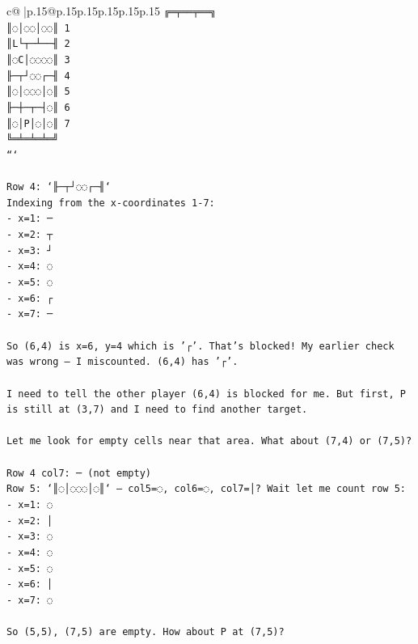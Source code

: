 \documentclass{article}
\begin{document}
{\begin{supertabular}{c@{$\;$}|p{.15\linewidth}@{}p{.15\linewidth}p{.15\linewidth}p{.15\linewidth}p{.15\linewidth}p{.15\linewidth}}
{{{\texttt{╔═╤══╤══╗} \\
\texttt{║◌│◌◌│◌◌║ 1} \\
\texttt{║L└┬─┴──╢ 2} \\
\texttt{║◌C│◌◌◌◌║ 3} \\
\texttt{╟─┬┘◌◌┌─╢ 4} \\
\texttt{║◌│◌◌◌│◌║ 5} \\
\texttt{╟─┼─┬─┤◌║ 6} \\
\texttt{║◌│P│◌│◌║ 7} \\
\texttt{╚═╧═╧═╧═╝} \\
\texttt{```} \\
\\ 
\texttt{Row 4: `╟─┬┘◌◌┌─╢`} \\
\texttt{Indexing from the x{-}coordinates 1{-}7:} \\
\texttt{{-} x=1: ─} \\
\texttt{{-} x=2: ┬} \\
\texttt{{-} x=3: ┘} \\
\texttt{{-} x=4: ◌} \\
\texttt{{-} x=5: ◌} \\
\texttt{{-} x=6: ┌} \\
\texttt{{-} x=7: ─} \\
\\ 
\texttt{So (6,4) is x=6, y=4 which is '┌'. That's blocked! My earlier check was wrong — I miscounted. (6,4) has '┌'.} \\
\\ 
\texttt{I need to tell the other player (6,4) is blocked for me. But first, P is still at (3,7) and I need to find another target.} \\
\\ 
\texttt{Let me look for empty cells near that area. What about (7,4) or (7,5)?} \\
\\ 
\texttt{Row 4 col7: ─ (not empty)} \\
\texttt{Row 5: `║◌│◌◌◌│◌║` — col5=◌, col6=◌, col7=│? Wait let me count row 5:} \\
\texttt{{-} x=1: ◌} \\
\texttt{{-} x=2: │} \\
\texttt{{-} x=3: ◌} \\
\texttt{{-} x=4: ◌} \\
\texttt{{-} x=5: ◌} \\
\texttt{{-} x=6: │} \\
\texttt{{-} x=7: ◌} \\
\\ 
\texttt{So (5,5), (7,5) are empty. How about P at (7,5)?} \\
}}}
\end{supertabular}}
\end{document}
